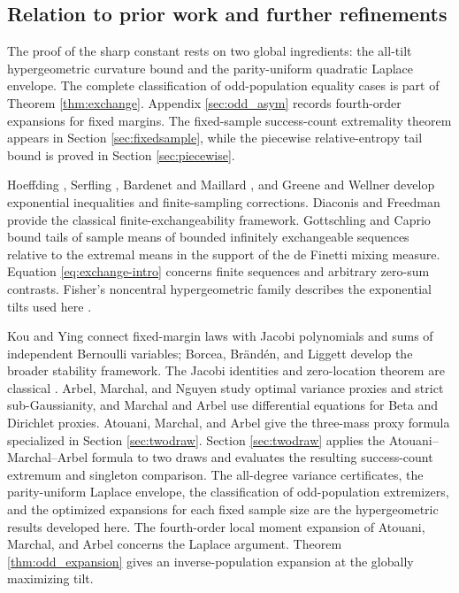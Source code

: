 \documentclass[11pt,a4paper]{article}
\begin{document}
\subsection{Relation to prior work and further refinements}
The proof of the sharp constant rests on two global ingredients: the all-tilt hypergeometric curvature bound and the parity-uniform quadratic Laplace envelope. The complete classification of odd-population equality cases is part of Theorem \ref{thm:exchange}. Appendix \ref{sec:odd_asym} records fourth-order expansions for fixed margins. The fixed-sample success-count extremality theorem appears in Section \ref{sec:fixedsample}, while the piecewise relative-entropy tail bound is proved in Section \ref{sec:piecewise}.

Hoeffding \cite{Hoeffding}, Serfling \cite{Serfling}, Bardenet and Maillard \cite{BardenetMaillard}, and Greene and Wellner \cite{GreeneWellner} develop exponential inequalities and finite-sampling corrections. Diaconis and Freedman \cite{DiaconisFreedman} provide the classical finite-exchangeability framework. Gottschling and Caprio \cite{GottschlingCaprio} bound tails of sample means of bounded infinitely exchangeable sequences relative to the extremal means in the support of the de Finetti mixing measure. Equation \eqref{eq:exchange-intro} concerns finite sequences and arbitrary zero-sum contrasts. Fisher's noncentral hypergeometric family describes the exponential tilts used here \cite{Fog}.

Kou and Ying \cite{Kou} connect fixed-margin laws with Jacobi polynomials and sums of independent Bernoulli variables; Borcea, Br\"and\'en, and Liggett \cite{BBL} develop the broader stability framework. The Jacobi identities and zero-location theorem are classical \cite[Chapter IV and Section 6.7]{Szego}. Arbel, Marchal, and Nguyen \cite{ArbelMarchalNguyen} study optimal variance proxies and strict sub-Gaussianity, and Marchal and Arbel \cite{MarchalArbel} use differential equations for Beta and Dirichlet proxies. Atouani, Marchal, and Arbel \cite[Theorem 3.2 and Corollary 3.3]{AtouaniMarchalArbel} give the three-mass proxy formula specialized in Section \ref{sec:twodraw}. Section \ref{sec:twodraw} applies the Atouani--Marchal--Arbel formula to two draws and evaluates the resulting success-count extremum and singleton comparison. The all-degree variance certificates, the parity-uniform Laplace envelope, the classification of odd-population extremizers, and the optimized expansions for each fixed sample size are the hypergeometric results developed here. The fourth-order local moment expansion of Atouani, Marchal, and Arbel \cite[Remark 3.6]{AtouaniMarchalArbel} concerns the Laplace argument. Theorem \ref{thm:odd_expansion} gives an inverse-population expansion at the globally maximizing tilt.
\end{document}
